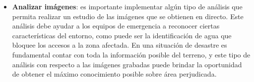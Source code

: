 \begin{itemize}
\item \textbf{Analizar imágenes}: es importante implementar algún tipo de análisis que permita realizar un estudio de las imágenes que se obtienen en directo. Este análisis debe ayudar a los equipos de emergencia a reconocer ciertas características del entorno, como puede ser la identificación de agua que bloquee los accesos a la zona afectada. En una situación de desastre es fundamental contar con toda la información posible del terreno, y este tipo de análisis con respecto a las imágenes grabadas puede brindar la oportunidad de obtener el máximo conocimiento posible sobre área perjudicada.

\end{itemize}


